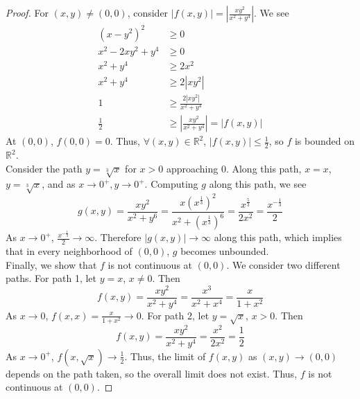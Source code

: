 \documentclass[11pt]{article}
\begin{document}
\begin{exercise}{7}
    \begin{proof}
        For $(x, y) \neq (0, 0)$, consider $|f(x, y)| = \left| \frac{xy^2}{x^2 + y^4} \right|$. We see \begin{equation*}
            \begin{split}
                (x - y^2)^2 & \ge 0 \\
                x^2 - 2xy^2 + y^4 & \ge 0 \\
                x^2 + y^4 & \ge 2x^2 \\
                x^2 + y^4 & \ge 2|xy^2| \\
                1 & \ge \frac{2|xy^2|}{x^2 + y^4} \\
                \frac{1}{2} & \ge \left| \frac{xy^2}{x^2 + y^4} \right| = |f(x, y)|
            \end{split}
        \end{equation*}
        At $(0, 0)$, $f(0,0) = 0$. Thus, $\forall (x, y) \in \mathbb{R}^2$, $|f(x, y)| \le \frac{1}{2}$, so $f$ is bounded on $\mathbb{R}^2$. \\

        Consider the path $y = \sqrt[3]{x}$ for $x > 0$ approaching 0. Along this path, $x = x$, $y = \sqrt[3]{x}$, and as $x \to 0^+, y \to 0^+$. Computing $g$ along this path, we see $$g(x, y) = \frac{xy^2}{x^2 + y^6} = \frac{x(x^{\frac{1}{3}})^2}{x^2 + (x^{\frac{1}{3}})^6} = \frac{x^{\frac{5}{3}}}{2x^2} = \frac{x^{-\frac{1}{3}}}{2}$$ As $x \to 0^+$, $\frac{x^{- \frac{1}{3}}}{2} \to \infty$. Therefore $|g(x, y)| \to \infty$ along this path, which implies that in every neighborhood of $(0, 0)$, $g$ becomes unbounded. \\

        Finally, we show that $f$ is not continuous at $(0, 0)$. We consider two different paths. For path 1, let $y = x$, $x \neq 0$. Then $$f(x, y) = \frac{xy^2}{x^2 + y^4} = \frac{x^3}{x^2 + x^4} = \frac{x}{1 + x^2}$$ As $x \to 0$, $f(x, x) = \frac{x}{1 + x^2} \to 0$. For path 2, let $y = \sqrt{x}$, $x > 0$. Then $$f(x, y) = \frac{xy^2}{x^2 + y^4} = \frac{x^2}{2x^2} = \frac{1}{2}$$ As $x \to 0^+$, $f(x, \sqrt{x}) \to \frac{1}{2}$. Thus, the limit of $f(x, y)$ as $(x, y) \to (0, 0)$ depends on the path taken, so the overall limit does not exist. Thus, $f$ is not continuous at $(0, 0)$. 
    \end{proof}
\end{exercise}
\end{document}
